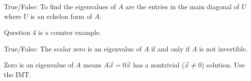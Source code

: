 \documentclass{ximera}
\begin{document}
  	  		             \begin{question} True/False: To find the eigenvalues of $A$ are the entries in the main diagonal of $U$ where $U$ is an echelon form of $A$.\\
  	  		             	
  	  		             	\begin{multipleChoice}
  	  		             	\end{multipleChoice}
  	  		             	
  	  		             	\begin{hint}
  	  		             		Question 4 is a counter example.
  	  		             	\end{hint}
  	  		             	
  	  		             \end{question}	
  	  		    \begin{question} True/False: The scalar zero is an eigenvalue of $A$ if and only if $A$ is not invertible.
  	  		    	
  	  		    	\begin{multipleChoice}
  	  		    		\choice[correct]{True}
  	  		    		\choice{False}
  	  		    	\end{multipleChoice}
  	  		    	
  	  		    	\begin{hint}
  	  		    		Zero is an eigenvalue of $A$ means $A\vec{x} = 0\vec{x}$ has a nontrivial ($\vec{x}\neq 0$) solution. Use the IMT.
  	  		    	\end{hint}
  	  		    	
  	  		    \end{question}	
  
\end{document}

